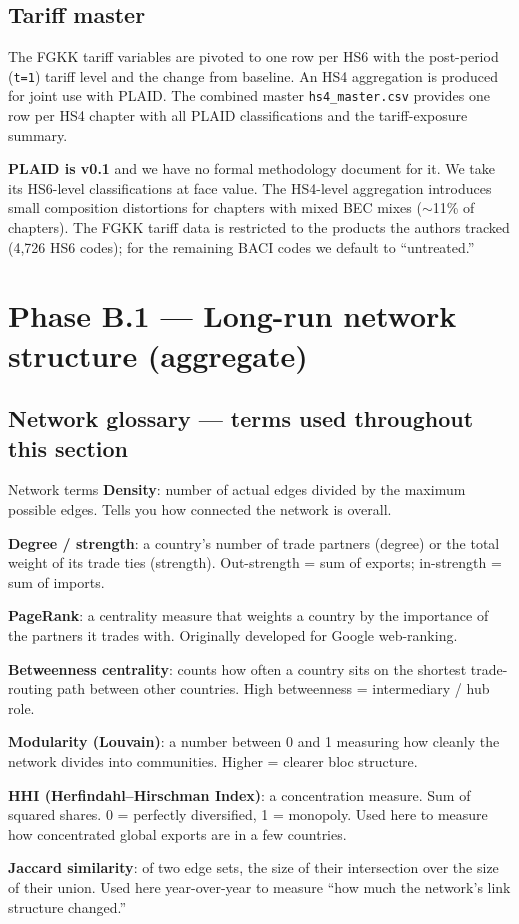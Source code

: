 \documentclass[11pt,a4paper]{article}
\begin{document}
\subsection{Tariff master}

The FGKK tariff variables are pivoted to one row per HS6 with the
post-period (\texttt{t=1}) tariff level and the change from baseline. An
HS4 aggregation is produced for joint use with PLAID. The combined master
\texttt{hs4\_master.csv} provides one row per HS4 chapter with all PLAID
classifications and the tariff-exposure summary.

\begin{limitbox}
\textbf{PLAID is v0.1} and we have no formal methodology document for it. We
take its HS6-level classifications at face value. The HS4-level aggregation
introduces small composition distortions for chapters with mixed BEC mixes
($\sim$11\% of chapters). The FGKK tariff data is restricted to the products
the authors tracked (4{,}726 HS6 codes); for the remaining BACI codes we
default to ``untreated.''
\end{limitbox}

\section{Phase B.1 — Long-run network structure (aggregate)}

\subsection{Network glossary — terms used throughout this section}

\begin{glossbox}{Network terms}
\textbf{Density}: number of actual edges divided by the maximum possible
edges. Tells you how connected the network is overall.

\textbf{Degree / strength}: a country's number of trade partners (degree) or
the total weight of its trade ties (strength). Out-strength = sum of exports;
in-strength = sum of imports.

\textbf{PageRank}: a centrality measure that weights a country by the
importance of the partners it trades with. Originally developed for Google
web-ranking.

\textbf{Betweenness centrality}: counts how often a country sits on the
shortest trade-routing path between other countries. High betweenness =
intermediary / hub role.

\textbf{Modularity (Louvain)}: a number between 0 and 1 measuring how cleanly
the network divides into communities. Higher = clearer bloc structure.

\textbf{HHI (Herfindahl--Hirschman Index)}: a concentration measure. Sum of
squared shares. 0 = perfectly diversified, 1 = monopoly. Used here to
measure how concentrated global exports are in a few countries.

\textbf{Jaccard similarity}: of two edge sets, the size of their intersection
over the size of their union. Used here year-over-year to measure
``how much the network's link structure changed.''
\end{glossbox}
\end{document}

